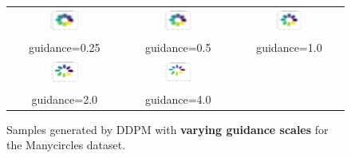 \documentclass[11pt]{article}
\begin{document}
\begin{figure}[H]
    \centering
    \begin{tabular}{ccc}
        \includegraphics[width=0.3\textwidth]{exps/ddpm_2_150_0.0001_0.02_manycircles/samples_cfg_150_0.25.png} &
        \includegraphics[width=0.3\textwidth]{exps/ddpm_2_150_0.0001_0.02_manycircles/samples_cfg_150_0.5.png} &
        \includegraphics[width=0.3\textwidth]{exps/ddpm_2_150_0.0001_0.02_manycircles/samples_cfg_150_1.0.png} \\
        guidance=0.25 & guidance=0.5 & guidance=1.0 \\ [0.5em]

        \includegraphics[width=0.3\textwidth]{exps/ddpm_2_150_0.0001_0.02_manycircles/samples_cfg_150_2.0.png} &
        \includegraphics[width=0.3\textwidth]{exps/ddpm_2_150_0.0001_0.02_manycircles/samples_cfg_150_4.0.png} & \\
        guidance=2.0 & guidance=4.0 & \\
    \end{tabular}
    \caption{Samples generated by DDPM with \textbf{varying guidance scales} for the Manycircles dataset.}
    \label{fig:guidance_manycircles}
\end{figure}
\end{document}
